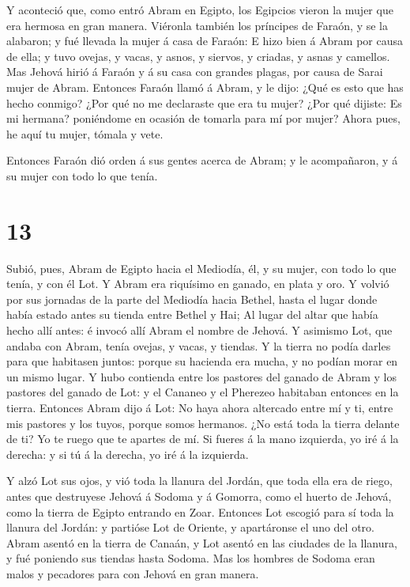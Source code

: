  Y aconteció que, como entró Abram en Egipto, los Egipcios
vieron la mujer que era hermosa en gran manera.  Viéronla
también los príncipes de Faraón, y se la alabaron; y fué llevada la
mujer á casa de Faraón:  E hizo bien á Abram por causa de
ella; y tuvo ovejas, y vacas, y asnos, y siervos, y criadas, y asnas y
camellos.  Mas Jehová hirió á Faraón y á su casa con
grandes plagas, por causa de Sarai mujer de Abram. 
Entonces Faraón llamó á Abram, y le dijo: ¿Qué es esto que has hecho
conmigo? ¿Por qué no me declaraste que era tu mujer?  ¿Por
qué dijiste: Es mi hermana? poniéndome en ocasión de tomarla para mí por
mujer? Ahora pues, he aquí tu mujer, tómala y vete.

 Entonces Faraón dió orden á sus gentes acerca de Abram; y
le acompañaron, y á su mujer con todo lo que tenía.

\hypertarget{section-12}{%
\section{13}\label{section-12}}

 Subió, pues, Abram de Egipto hacia el Mediodía, él, y su
mujer, con todo lo que tenía, y con él Lot.  Y Abram era
riquísimo en ganado, en plata y oro.  Y volvió por sus
jornadas de la parte del Mediodía hacia Bethel, hasta el lugar donde
había estado antes su tienda entre Bethel y Hai;  Al lugar
del altar que había hecho allí antes: é invocó allí Abram el nombre de
Jehová.  Y asimismo Lot, que andaba con Abram, tenía ovejas,
y vacas, y tiendas.  Y la tierra no podía darles para que
habitasen juntos: porque su hacienda era mucha, y no podían morar en un
mismo lugar.  Y hubo contienda entre los pastores del ganado
de Abram y los pastores del ganado de Lot: y el Cananeo y el Pherezeo
habitaban entonces en la tierra.  Entonces Abram dijo á Lot:
No haya ahora altercado entre mí y ti, entre mis pastores y los tuyos,
porque somos hermanos.  ¿No está toda la tierra delante de
ti? Yo te ruego que te apartes de mí. Si fueres á la mano izquierda, yo
iré á la derecha: y si tú á la derecha, yo iré á la izquierda.

 Y alzó Lot sus ojos, y vió toda la llanura del Jordán, que
toda ella era de riego, antes que destruyese Jehová á Sodoma y á
Gomorra, como el huerto de Jehová, como la tierra de Egipto entrando en
Zoar.  Entonces Lot escogió para sí toda la llanura del
Jordán: y partióse Lot de Oriente, y apartáronse el uno del otro.
 Abram asentó en la tierra de Canaán, y Lot asentó en las
ciudades de la llanura, y fué poniendo sus tiendas hasta Sodoma.
 Mas los hombres de Sodoma eran malos y pecadores para con
Jehová en gran manera.

